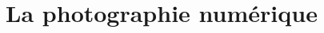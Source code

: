 \documentclass[a4paper]{article}
\newlength{\stextwidth} %
\newcommand{\guess}[1]{\ifthenelse{\boolean{reveal}}{{\color{red}#1}}{\settowidth{\stextwidth}{#1}\makebox[\stextwidth]{\dotfill}}}
\begin{document}
\title{La photographie numérique}

\pagestyle{empty}

\date{}
\author{}

\maketitle{}

\thispagestyle{empty}
%
%
%
%
%
\end{document}
